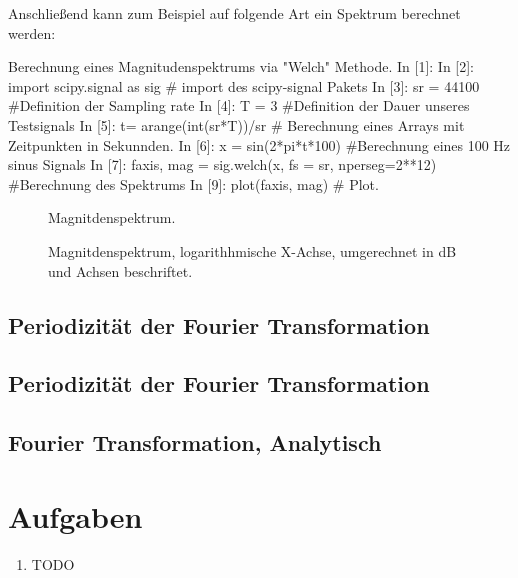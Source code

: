 
Anschließend kann zum Beispiel auf folgende Art ein Spektrum berechnet werden:

\begin{python}{Berechnung eines Magnitudenspektrums via "Welch" Methode.}
In [1]: %
In [2]: import scipy.signal as sig # import des scipy-signal Pakets
In [3]: sr = 44100 #Definition der Sampling rate
In [4]: T = 3 #Definition der Dauer unseres Testsignals
In [5]: t= arange(int(sr*T))/sr # Berechnung eines Arrays mit Zeitpunkten in Sekunnden.
In [6]: x = sin(2*pi*t*100) #Berechnung eines 100 Hz sinus Signals
In [7]: faxis, mag = sig.welch(x, fs = sr, nperseg=2**12) #Berechnung des Spektrums
In [9]: plot(faxis, mag) # Plot.
\end{python}


\begin{figure}[H]
    \centering
    
    \caption{Magnitdenspektrum.}
    \label{fig:specSimple}
\end{figure}



\begin{figure}[H]
    \centering
    
    \caption{Magnitdenspektrum, logarithhmische X-Achse, umgerechnet in dB und Achsen beschriftet.}
    \label{fig:specSimple_loglog}
\end{figure}

\subsection*{Periodizität der Fourier Transformation}

\subsection*{Periodizität der Fourier Transformation}

\subsection*{Fourier Transformation, Analytisch}

\section{Aufgaben}
\begin{enumerate}
\item TODO
\end{enumerate}
